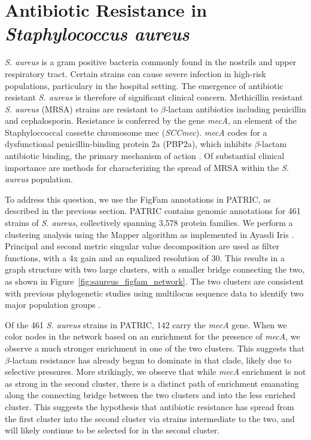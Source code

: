 \section{Antibiotic Resistance in \emph{Staphylococcus aureus}}
\label{sec:staph_aureus}
%
\emph{S. aureus} is a gram positive bacteria commonly found in the nostrils and upper respiratory tract.
Certain strains can cause severe infection in high-risk populations, particulary in the hospital setting.
The emergence of antibiotic resistant \emph{S. aureus} is therefore of significant clinical concern.
Methicillin resistant \emph{S. aureus} (MRSA) strains are resistant to $\beta$-lactam antibiotics including penicillin and cephalosporin.
Resistance is conferred by the gene \emph{mecA}, an element of the Staphyloccoccal cassette chromosome mec (\emph{SCCmec}).
\emph{mecA} codes for a dysfunctional penicillin-binding protein 2a (PBP2a), which inhibits $\beta$-lactam antibiotic binding, the primary mechanism of action \cite{Jensen:2009fu}.
Of substantial clinical importance are methods for characterizing the spread of MRSA within the \emph{S. aureus} population.

To address this question, we use the FigFam annotations in PATRIC, as described in the previous section.
PATRIC contains genomic annotations for 461 strains of \emph{S. aureus}, collectively spanning 3,578 protein families.
We perform a clustering analysis using the Mapper algorithm as implemented in Ayasdi Iris \cite{AyasdiIris:2015}.
Principal and second metric singular value decomposition are used as filter functions, with a 4x gain and an equalized resolution of 30.
This results in a graph structure with two large clusters, with a smaller bridge connecting the two, as shown in Figure~\ref{fig:saureus_figfam_network}.
The two clusters are consistent with previous phylogenetic studies using multilocus sequence data to identify two major population groups \cite{Cooper:2006dp}.

Of the 461 \emph{S. aureus} strains in PATRIC, 142 carry the \emph{mecA} gene.
When we color nodes in the network based on an enrichment for the presence of \emph{mecA}, we observe a much stronger enrichment in one of the two clusters.
This suggests that $\beta$-lactam resistance has already begun to dominate in that clade, likely due to selective pressures.
More strikingly, we observe that while \emph{mecA} enrichment is not as strong in the second cluster, there is a distinct path of enrichment emanating along the connecting bridge between the two clusters and into the less enriched cluster.
This suggests the hypothesis that antibiotic resistance has spread from the first cluster into the second cluster via strains intermediate to the two, and will likely continue to be selected for in the second cluster.

